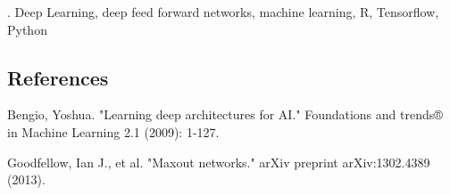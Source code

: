 \documentclass[12pt]{article}
\begin{document}
.
Deep Learning, deep feed forward networks, machine learning, R, Tensorflow, Python 


%        
%
%        

\subsection*{References}

\begin{description}

\item
Bengio, Yoshua. "Learning deep architectures for AI." Foundations and trends® in Machine Learning 2.1 (2009): 1-127.

\item
Goodfellow, Ian J., et al. "Maxout networks." arXiv preprint arXiv:1302.4389 (2013).

\end{description}
\end{document}
